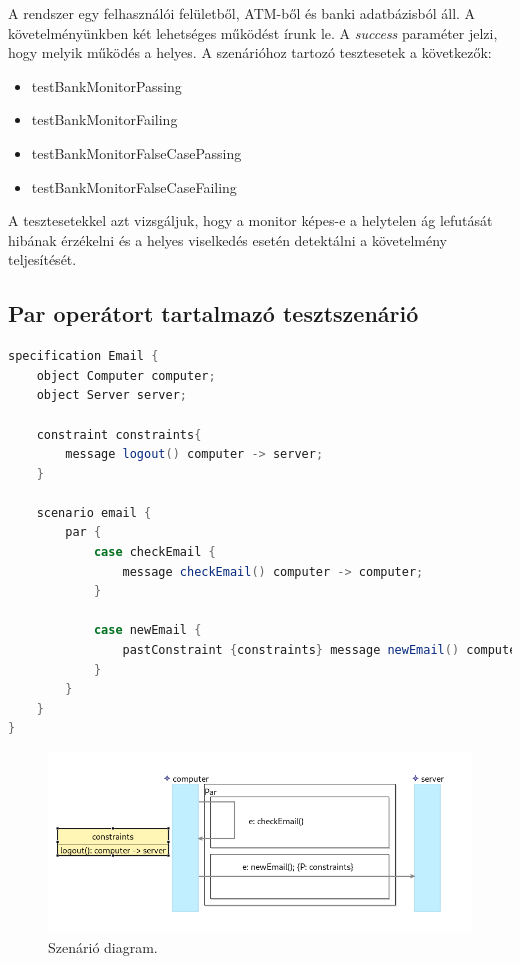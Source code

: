 A rendszer egy felhasználói felületből, ATM-ből és banki adatbázisból áll.
A követelményünkben két lehetséges működést írunk le.
A \textit{success} paraméter jelzi, hogy melyik működés a helyes.
A szenárióhoz tartozó tesztesetek a következők:

\begin{itemize}
    \item testBankMonitorPassing
    \item testBankMonitorFailing
    \item testBankMonitorFalseCasePassing
    \item testBankMonitorFalseCaseFailing
\end{itemize}

A tesztesetekkel azt vizsgáljuk, hogy a monitor képes-e a helytelen ág lefutását hibának érzékelni és a helyes viselkedés esetén detektálni a követelmény teljesítését.

\clearpage\subsection{Par operátort tartalmazó tesztszenárió}

\begin{lstlisting}[language=java, frame=single, float=ht!, caption={Integrációs teszteset.},captionpos=b]
specification Email {
    object Computer computer;
    object Server server;

    constraint constraints{
        message logout() computer -> server;
    }

    scenario email {
        par {
            case checkEmail {
                message checkEmail() computer -> computer;
            }

            case newEmail {
                pastConstraint {constraints} message newEmail() computer -> server;
            }
        }
    }
}
\end{lstlisting}

\begin{figure}[!ht]
    \centering
    \includegraphics[width=150mm, keepaspectratio]{figures/diagramParExample.png}
    \caption{Szenárió diagram.}
\end{figure}

